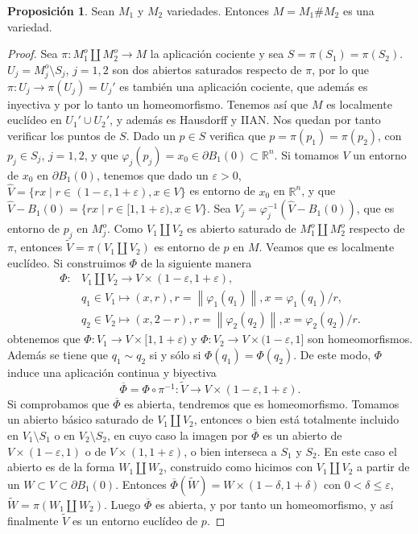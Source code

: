\documentclass[10pt]{report}
\newcommand{\R}{\mathbb{R}}
\newcommand{\norm}[1]{\left\lVert#1\right\rVert} %
\theoremstyle{definition}
\newtheorem{prop}[defin]{Proposición}
\begin{document}
\begin{prop}\label{prop:suma_conexa}%
Sean $M_1$ y $M_2$ variedades. Entonces $M=M_1\#M_2$ es una variedad.
\end{prop}
\begin{proof}

Sea $\pi:M_1^o\amalg M_2^o\to M$ la aplicación cociente y sea $S=\pi (S_1)=\pi (S_2)$.  $U_j=M_j^o\setminus S_j$, $j=1,2$ son dos abiertos saturados respecto de $\pi$, por lo que $\pi :U_ j\to \pi (U_j)=U_j'$ es también una aplicación cociente, que además es inyectiva y por lo tanto un homeomorfismo. Tenemos así que $M$ es localmente euclídeo en $U_1'\cup U_2'$, y además es Hausdorff y IIAN. Nos quedan por tanto verificar los puntos de $S$.
Dado un $p\in S$ verifica que $p=\pi (p_1)=\pi (p_2)$, con $p_j\in S_j$, $j=1,2$, y que  $\varphi_j(p_j)=x_0 \in \partial B_1(0) \subset \R^n$. Si tomamos $V$ un entorno de $x_0$ en $\partial B_1(0)$, tenemos que dado un $\varepsilon >0$, $\hat{V}=\{rx\mid   r\in (1-\varepsilon , 1+\varepsilon ), x\in V\} $ es entorno de $x_0$ en $\R^n$, y que $\hat{V}-B_1(0)=\{rx\mid r\in [1, 1+\varepsilon ), x \in V\}$. Sea $V_j=\varphi_j^{-1}(\hat{V}-B_1(0))$, que es entorno de $p_j$ en $M_j^o$. Como $ V_1\amalg V_2$ es abierto saturado de $M_1^o\amalg M_2^o$ respecto de $\pi$, entonces $\tilde{V}=\pi (V _1\amalg V_2)$ es entorno de $p$ en $M$. Veamos que es localmente euclídeo. Si construimos $\Phi$ de la siguiente manera
\begin{align*}
\Phi : &  V_1\amalg V_2  \to  V\times (1-\varepsilon , 1+ \varepsilon ), \\
& q_1\in  V_1  \mapsto  (x,r), r=\norm{\varphi_1(q_1)}, x=\varphi_1(q_1)/r,\\
& q_2\in V_2  \mapsto  (x,2-r), r= \norm{\varphi_2(q_2)}, x= \varphi_2(q_2)/r.
\end{align*}
obtenemos que $\Phi :  V_1 \to V \times [1, 1+\varepsilon)$ y $\Phi : V_2 \to V \times (1- \varepsilon, 1]$ son homeomorfismos. Además se tiene que $q_1 \sim q_2$ si y sólo si $\Phi(q_1)=\Phi(q_2)$.  De este modo, $\Phi$ induce una aplicación continua y biyectiva $$\overline{\Phi}=\Phi \circ \pi^{-1}: \tilde{V} \to V \times (1- \varepsilon, 1+ \varepsilon).$$
Si comprobamos que $\overline{\Phi}$ es abierta, tendremos que es homeomorfismo. Tomamos un abierto básico saturado de $V_1\amalg V_2$, entonces o bien está totalmente incluido en $V_1\setminus S_1$ o en $V_2\setminus S_2$, en cuyo caso la imagen por $\overline{\Phi}$ es un abierto de $V\times (1-\varepsilon ,1)$ o de $V\times (1,1+\varepsilon )$, o bien interseca a $S_1$ y $S_2$. En este caso el abierto es de la forma $W_1\amalg W_2$, construido como hicimos con $V_1\amalg V_2$ a partir de un $W\subset V \subset \partial B_1(0)$. Entonces $\overline{\Phi} (\tilde{W})= W \times (1-\delta , 1+\delta )$ con $0<\delta \leq \varepsilon$, $\tilde{W} = \pi (W_1 \amalg W_2)$. Luego $\overline{\Phi}$ es abierta, y por tanto un homeomorfismo, y así finalmente $\tilde{V}$ es un entorno euclídeo de $p$. 


\end{proof}
\end{document}
